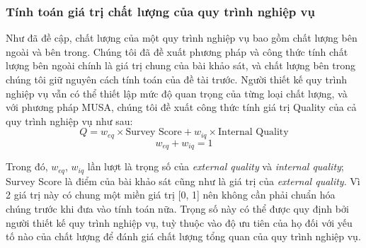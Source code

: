 \subsubsection{Tính toán giá trị chất lượng của quy trình nghiệp vụ}
Như đã đề cập, chất lượng của một quy trình nghiệp vụ bao gồm chất lượng bên ngoài và bên trong. Chúng tôi đã đề xuất phương pháp và công thức tính chất lượng bên ngoài chính là giá trị chung của bài khảo sát, và chất lượng bên trong chúng tôi giữ nguyên cách tính toán của đề tài trước.
Người thiết kế quy trình nghiệp vụ vẫn có thể thiết lập mức độ quan trọng của từng loại chất lượng, và với phương pháp MUSA, chúng tôi đề xuất công thức tính giá trị Quality của cả quy trình nghiệp vụ như sau:
\[ Q =  w_{eq} \times \text{Survey Score} + w_{iq} \times \text{Internal Quality}\]
\[w_{eq} + w_{iq} = 1\]
\par
Trong đó, $w_{eq}$, $w_{iq}$ lần lượt là trọng số của \emph{external quality} và \emph{internal quality}; Survey Score là điểm của bài khảo sát cũng như là giá trị của \emph{external quality}. Vì 2 giá trị này có chung một miền giá trị [0, 1] nên không cần phải chuẩn hóa chúng trước khi đưa vào tính toán nữa. Trọng số này có thể được quy định bởi người thiết kế quy trình nghiệp vụ, tuỳ thuộc vào độ ưu tiên của họ đối với yếu tố nào của chất lượng để đánh giá chất lượng tổng quan của quy trình nghiệp vụ.
